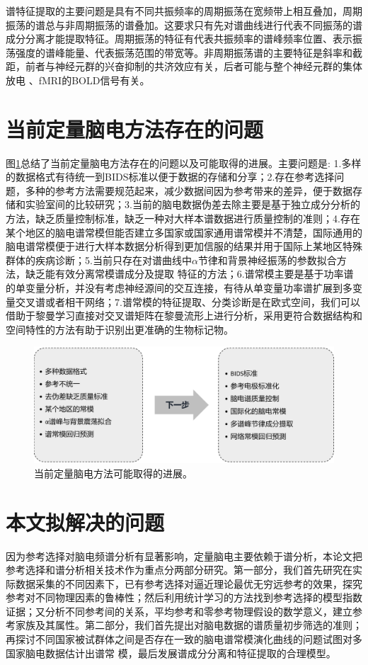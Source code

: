 谱特征提取的主要问题是具有不同共振频率的周期振荡在宽频带上相互叠加，周期振荡的谱总与非周期振荡的谱叠加。这要求只有先对谱曲线进行代表不同振荡的谱成分分离才能提取特征。周期振荡的特征有代表共振频率的谱峰频率位置、表示振荡强度的谱峰能量、代表振荡范围的带宽等。非周期振荡谱的主要特征是斜率和截距，前者与神经元群的兴奋抑制的共济效应有关，后者可能与整个神经元群的集体放电
、fMRI的BOLD信号有关。

\section{当前定量脑电方法存在的问题}
图\ref{1:qEEGnext}总结了当前定量脑电方法存在的问题以及可能取得的进展。主要问题是: 1.多样的数据格式有待统一到BIDS标准以便于数据的存储和分享；2.存在参考选择问题，多种的参考方法需要规范起来，减少数据间因为参考带来的差异，便于数据存储和实验室间的比较研究；3.当前的脑电数据伪差去除主要是基于独立成分分析的方法，缺乏质量控制标准，缺乏一种对大样本谱数据进行质量控制的准则；4.存在某个地区的脑电谱常模但能否建立多国家或国家通用谱常模并不清楚，国际通用的脑电谱常模便于进行大样本数据分析得到更加信服的结果并用于国际上某地区特殊群体的疾病诊断；5.当前只存在对谱曲线中$\alpha$节律和背景神经振荡的参数拟合方法，缺乏能有效分离常模谱成分及提取
特征的方法；6.谱常模主要是基于功率谱的单变量分析，并没有考虑神经源间的交互连接，有待从单变量功率谱扩展到多变量交叉谱或者相干网络；7.谱常模的特征提取、分类诊断是在欧式空间，我们可以借助于黎曼学习直接对交叉谱矩阵在黎曼流形上进行分析，采用更符合数据结构和空间特性的方法有助于识别出更准确的生物标记物。
\begin{figure}[!h]
	\includegraphics[width=12cm]{pic/xulun/qEEGnext.png}
	\caption{当前定量脑电方法可能取得的进展。}
	\label{1:qEEGnext}
\end{figure}

\section{本文拟解决的问题}
因为参考选择对脑电频谱分析有显著影响，定量脑电主要依赖于谱分析，本论文把参考选择和谱分析相关技术作为重点分两部分研究。第一部分，我们首先研究在实际数据采集的不同因素下，已有参考选择对逼近理论最优无穷远参考的效果，探究参考对不同物理因素的鲁棒性；然后利用统计学习的方法找到参考选择的模型指数证据；又分析不同参考间的关系，平均参考和零参考物理假设的数学意义，建立参考家族及其属性。第二部分，我们首先提出对脑电数据的谱质量初步筛选的准则；再探讨不同国家被试群体之间是否存在一致的脑电谱常模演化曲线的问题试图对多国家脑电数据估计出谱常
模，最后发展谱成分分离和特征提取的合理模型。

